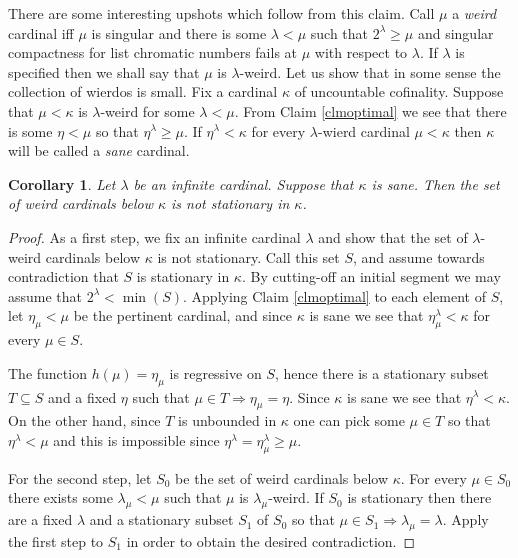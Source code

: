 \documentclass[11pt]{amsart}
\newtheorem{corollary}[theorem]{Corollary}
\theoremstyle{definition}
\theoremstyle{remark}
\begin{document}
There are some interesting upshots which follow from this claim.
Call $\mu$ a \emph{weird} cardinal iff $\mu$ is singular and there is some $\lambda<\mu$ such that $2^\lambda\geq\mu$ and singular compactness for list chromatic numbers fails at $\mu$ with respect to $\lambda$.
If $\lambda$ is specified then we shall say that $\mu$ is $\lambda$-weird.
Let us show that in some sense the collection of wierdos is small.
Fix a cardinal $\kappa$ of uncountable cofinality.
Suppose that $\mu<\kappa$ is $\lambda$-weird for some $\lambda<\mu$.
From Claim \ref{clmoptimal} we see that there is some $\eta<\mu$ so that $\eta^\lambda\geq\mu$.
If $\eta^\lambda<\kappa$ for every $\lambda$-wierd cardinal $\mu<\kappa$ then $\kappa$ will be called a \emph{sane} cardinal.

\begin{corollary}
\label{corweird} Let $\lambda$ be an infinite cardinal.
Suppose that $\kappa$ is sane.
Then the set of weird cardinals below $\kappa$ is not stationary in $\kappa$.
\end{corollary}

\begin{proof}
As a first step, we fix an infinite cardinal $\lambda$ and show that the set of $\lambda$-weird cardinals below $\kappa$ is not stationary.
Call this set $S$, and assume towards contradiction that $S$ is stationary in $\kappa$.
By cutting-off an initial segment we may assume that $2^\lambda<\min(S)$.
Applying Claim \ref{clmoptimal} to each element of $S$, let $\eta_\mu<\mu$ be the pertinent cardinal, and since $\kappa$ is sane we see that $\eta_\mu^\lambda<\kappa$ for every $\mu\in S$.

The function $h(\mu)=\eta_\mu$ is regressive on $S$, hence there is a stationary subset $T\subseteq S$ and a fixed $\eta$ such that $\mu\in T\Rightarrow\eta_\mu=\eta$.
Since $\kappa$ is sane we see that $\eta^\lambda<\kappa$.
On the other hand, since $T$ is unbounded in $\kappa$ one can pick some $\mu\in T$ so that $\eta^\lambda<\mu$ and this is impossible since $\eta^\lambda=\eta_\mu^\lambda\geq\mu$.

For the second step, let $S_0$ be the set of weird cardinals below $\kappa$.
For every $\mu\in S_0$ there exists some $\lambda_\mu<\mu$ such that $\mu$ is $\lambda_\mu$-weird.
If $S_0$ is stationary then there are a fixed $\lambda$ and a stationary subset $S_1$ of $S_0$ so that $\mu\in S_1\Rightarrow\lambda_\mu=\lambda$.
Apply the first step to $S_1$ in order to obtain the desired contradiction.
\end{proof}
\end{document}
